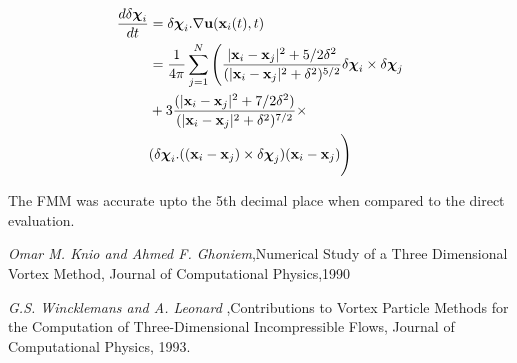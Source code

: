 \documentclass[10pt,a4paper]{report}
\newcommand{\xv}{{\bf x}}
\newcommand{\chiv}{{\boldsymbol \chi}}
\newcommand{\uv}{{\bf u}}
\begin{document}
\begin{align}
\frac{d\delta\chiv_i}{dt} &= \delta\chiv_i . \nabla \uv(\xv_i(t),t) \\
				&=  \frac{1}{4\pi} \displaystyle \sum_{j=1}^{N} \Bigg( \frac{|\xv_i - \xv_j|^2 + 5/2 \delta^2}{(|\xv_i - \xv_j|^2 + \delta^2)^{5/2}} \delta\chiv_i \times \delta\chiv_j \\
				&+ 3 \frac{(|\xv_i - \xv_j|^2 + 7/2 \delta^2)}{(|\xv_i - \xv_j|^2 + \delta^2)^{7/2}} \times \\
				&(\delta\chiv_i.((\xv_i - \xv_j)\times \delta\chiv_j)(\xv_i - \xv_j) \Bigg)
\end{align}

The FMM was accurate upto the 5th decimal place when compared to the direct evaluation. 

 







\begin{thebibliography}{3}
\emph{Omar M. Knio and Ahmed F. Ghoniem},Numerical Study of a Three Dimensional Vortex Method,
Journal of Computational Physics,1990

\emph{G.S. Wincklemans and A. Leonard}
,Contributions to Vortex Particle Methods for the Computation of Three-Dimensional Incompressible Flows,
Journal of Computational Physics, 1993.

\end{thebibliography}

 



 
\end{document}
